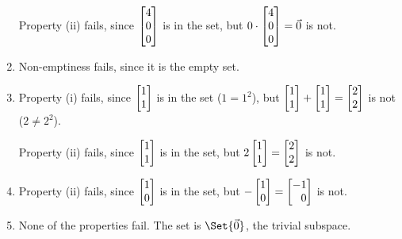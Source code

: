 \begin{exercises}
\begin{problist}
\begin{solution}
\begin{enumerate}
				Property (ii) fails, since $\mat{4\\0\\0}$ is in the set, but $0\cdot \mat{4\\0\\0}=\vec 0$ is not.

				\item Non-emptiness fails, since it is the empty set.

				\item Property (i) fails, since $\mat{1\\1}$ is in the set ($1=1^2$), but $\mat{1\\1}+\mat{1\\1}=\mat{2\\2}$ is not ($2\neq2^2$).

					Property (ii) fails, since $\mat{1\\1}$ is in the set, but $2\mat{1\\1}=\mat{2\\2}$ is not.

				\item Property (ii) fails, since $\mat{1\\0}$ is in the set, but $-\mat{1\\0}=\mat{-1\\0}$ is not.

				\item None of the properties fail. The set is $\Set{\vec 0}$, the trivial subspace.
			\end{enumerate}
		\end{solution}


\end{problist}
\end{exercises}
